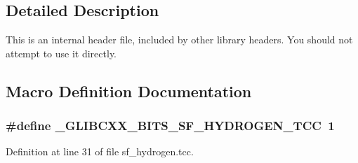 \subsection{Detailed Description}
This is an internal header file, included by other library headers. You should not attempt to use it directly. 

\subsection{Macro Definition Documentation}
\hypertarget{sf__hydrogen_8tcc_af6b60d2402ae885b7f3ef4519fb65ed9}{}
\subsubsection[{\+\_\+\+G\+L\+I\+B\+C\+X\+X\+\_\+\+B\+I\+T\+S\+\_\+\+S\+F\+\_\+\+H\+Y\+D\+R\+O\+G\+E\+N\+\_\+\+T\+C\+C}]{\setlength{\rightskip}{0pt plus 5cm}\#define \+\_\+\+G\+L\+I\+B\+C\+X\+X\+\_\+\+B\+I\+T\+S\+\_\+\+S\+F\+\_\+\+H\+Y\+D\+R\+O\+G\+E\+N\+\_\+\+T\+C\+C~1}\label{sf__hydrogen_8tcc_af6b60d2402ae885b7f3ef4519fb65ed9}


Definition at line 31 of file sf\+\_\+hydrogen.\+tcc.

